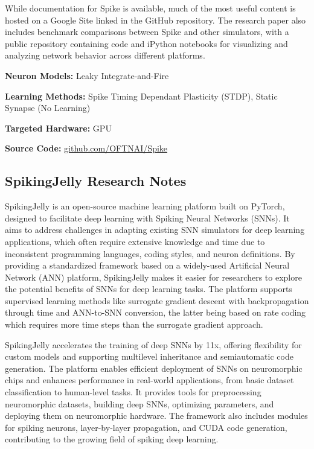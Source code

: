 While documentation for Spike is available, much of the most useful content is hosted on a Google Site linked in the GitHub repository. The research paper also includes benchmark comparisons between Spike and other simulators, with a public repository containing code and iPython notebooks for visualizing and analyzing network behavior across different platforms.

\begin{tcolorbox}[enhanced,attach boxed title to top center={yshift=-3mm,yshifttext=-1mm}, colback=blue!5!white,colframe=blue!75!black,colbacktitle=red!80!black, title=SPIKE at a Glance,fonttitle=\bfseries, boxed title style={size=small,colframe=red!50!black} ]

\textbf{Neuron Models:} Leaky Integrate-and-Fire

\textbf{Learning Methods:} Spike Timing Dependant Plasticity (STDP), Static Synapse (No Learning)  

\textbf{Targeted Hardware:} GPU 

\textbf{Source Code:} \href{https://github.com/OFTNAI/Spike}{github.com/OFTNAI/Spike}
\end{tcolorbox}
\subsection*{SpikingJelly Research Notes}\label{SpikingJelly}

SpikingJelly is an open-source machine learning platform built on PyTorch, designed to facilitate deep learning with Spiking Neural Networks (SNNs). It aims to address challenges in adapting existing SNN simulators for deep learning applications, which often require extensive knowledge and time due to inconsistent programming languages, coding styles, and neuron definitions. By providing a standardized framework based on a widely-used Artificial Neural Network (ANN) platform, SpikingJelly makes it easier for researchers to explore the potential benefits of SNNs for deep learning tasks. The platform supports supervised learning methods like surrogate gradient descent with backpropagation through time and ANN-to-SNN conversion, the latter being based on rate coding which requires more time steps than the surrogate gradient approach.

SpikingJelly accelerates the training of deep SNNs by 11x, offering flexibility for custom models and supporting multilevel inheritance and semiautomatic code generation. The platform enables efficient deployment of SNNs on neuromorphic chips and enhances performance in real-world applications, from basic dataset classification to human-level tasks. It provides tools for preprocessing neuromorphic datasets, building deep SNNs, optimizing parameters, and deploying them on neuromorphic hardware. The framework also includes modules for spiking neurons, layer-by-layer propagation, and CUDA code generation, contributing to the growing field of spiking deep learning.

